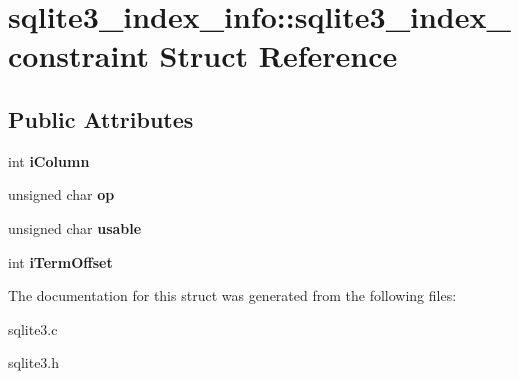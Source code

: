 \hypertarget{structsqlite3__index__info_1_1sqlite3__index__constraint}{}\section{sqlite3\+\_\+index\+\_\+info\+:\+:sqlite3\+\_\+index\+\_\+constraint Struct Reference}
\label{structsqlite3__index__info_1_1sqlite3__index__constraint}
\subsection*{Public Attributes}
\begin{DoxyCompactItemize}
\item 
int {\bfseries i\+Column}\hypertarget{structsqlite3__index__info_1_1sqlite3__index__constraint_a0f1e207060420058ee2881f2ea368e3a}{}\label{structsqlite3__index__info_1_1sqlite3__index__constraint_a0f1e207060420058ee2881f2ea368e3a}

\item 
unsigned char {\bfseries op}\hypertarget{structsqlite3__index__info_1_1sqlite3__index__constraint_a362f4ec1f71975cb0ac39a8b5e4b1476}{}\label{structsqlite3__index__info_1_1sqlite3__index__constraint_a362f4ec1f71975cb0ac39a8b5e4b1476}

\item 
unsigned char {\bfseries usable}\hypertarget{structsqlite3__index__info_1_1sqlite3__index__constraint_ae16e62caeab743cc68bb22227dacb501}{}\label{structsqlite3__index__info_1_1sqlite3__index__constraint_ae16e62caeab743cc68bb22227dacb501}

\item 
int {\bfseries i\+Term\+Offset}\hypertarget{structsqlite3__index__info_1_1sqlite3__index__constraint_a4e8368da66f34b7f07b369984b813d1b}{}\label{structsqlite3__index__info_1_1sqlite3__index__constraint_a4e8368da66f34b7f07b369984b813d1b}

\end{DoxyCompactItemize}


The documentation for this struct was generated from the following files\+:\begin{DoxyCompactItemize}
\item 
sqlite3.\+c\item 
sqlite3.\+h\end{DoxyCompactItemize}
